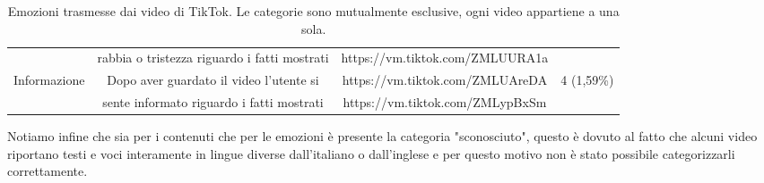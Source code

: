\begin{table*}[htb]
\begin{tabular}{l c c r}
        & rabbia o tristezza riguardo i fatti mostrati & https://vm.tiktok.com/ZMLUURA1a& \\
        Informazione & Dopo aver guardato il video l'utente si & https://vm.tiktok.com/ZMLUAreDA& 4 (1,59\%) \\
        & sente informato riguardo i fatti mostrati & https://vm.tiktok.com/ZMLypBxSm& \\
        \hline
    \end{tabular}    
    \caption{Emozioni trasmesse dai video di TikTok. Le categorie sono mutualmente esclusive, ogni video appartiene a una sola.}
    \label{tab:video_emotion}
\end{table*}

Notiamo infine che sia per i contenuti che per le emozioni è presente la categoria "sconosciuto", questo è dovuto al fatto 
che alcuni video riportano testi e voci interamente in lingue diverse dall'italiano o dall'inglese e per questo motivo non 
è stato possibile categorizzarli correttamente.